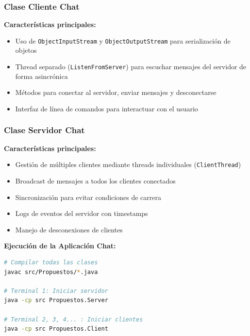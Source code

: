 \documentclass{article}
\begin{document}
\subsubsection{Clase Cliente Chat}



\textbf{Características principales:}
\begin{itemize}
    \item Uso de \texttt{ObjectInputStream} y \texttt{ObjectOutputStream} para serialización de objetos
    \item Thread separado (\texttt{ListenFromServer}) para escuchar mensajes del servidor de forma asincrónica
    \item Métodos para conectar al servidor, enviar mensajes y desconectarse
    \item Interfaz de línea de comandos para interactuar con el usuario
\end{itemize}

\subsubsection{Clase Servidor Chat}



\textbf{Características principales:}
\begin{itemize}
    \item Gestión de múltiples clientes mediante threads individuales (\texttt{ClientThread})
    \item Broadcast de mensajes a todos los clientes conectados
    \item Sincronización para evitar condiciones de carrera
    \item Logs de eventos del servidor con timestamps
    \item Manejo de desconexiones de clientes
\end{itemize}

\textbf{Ejecución de la Aplicación Chat:}

\begin{lstlisting}[language=bash, numbers=none, caption={Compilación y ejecución del Chat}]
# Compilar todas las clases
javac src/Propuestos/*.java

# Terminal 1: Iniciar servidor
java -cp src Propuestos.Server

# Terminal 2, 3, 4... : Iniciar clientes
java -cp src Propuestos.Client
\end{lstlisting}
\end{document}
